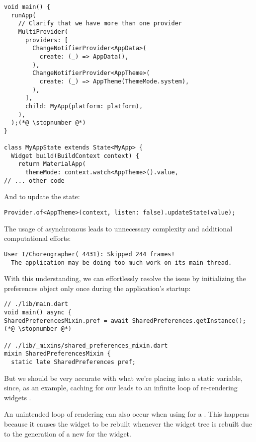 \begin{lstlisting}
void main() {
  runApp(
    // Clarify that we have more than one provider
    MultiProvider(
      providers: [
        ChangeNotifierProvider<AppData>(
          create: (_) => AppData(),
        ),
        ChangeNotifierProvider<AppTheme>(
          create: (_) => AppTheme(ThemeMode.system),
        ),
      ],
      child: MyApp(platform: platform),
    ),
  );(*@ \stopnumber @*)
}

class MyAppState extends State<MyApp> {
  Widget build(BuildContext context) {
    return MaterialApp(
      themeMode: context.watch<AppTheme>().value,
// ... other code
\end{lstlisting}

\noindent And to update the state:

\begin{lstlisting}
Provider.of<AppTheme>(context, listen: false).updateState(value);
\end{lstlisting}

\noindent The usage of asynchronous  leads to unnecessary complexity and additional computational efforts:

\begin{lstlisting}[language=terminal]
User I/Choreographer( 4431): Skipped 244 frames!
  The application may be doing too much work on its main thread.
\end{lstlisting}

\noindent With this understanding, we can effortlessly resolve the issue by initializing the preferences object only 
once during the application's startup:

\begin{lstlisting}
// ./lib/main.dart
void main() async {
SharedPreferencesMixin.pref = await SharedPreferences.getInstance();(*@ \stopnumber @*)

// ./lib/_mixins/shared_preferences_mixin.dart
mixin SharedPreferencesMixin {
  static late SharedPreferences pref;
\end{lstlisting}

\noindent But we should be very accurate with what we're placing into a static variable, since, as an example, 
caching  for our  leads to an infinite loop of re-rendering widgets .

An unintended loop of rendering can also occur when using  for a . This happens 
because it causes the widget to be rebuilt whenever the widget tree is rebuilt due to the generation of a new 
 for the widget.
